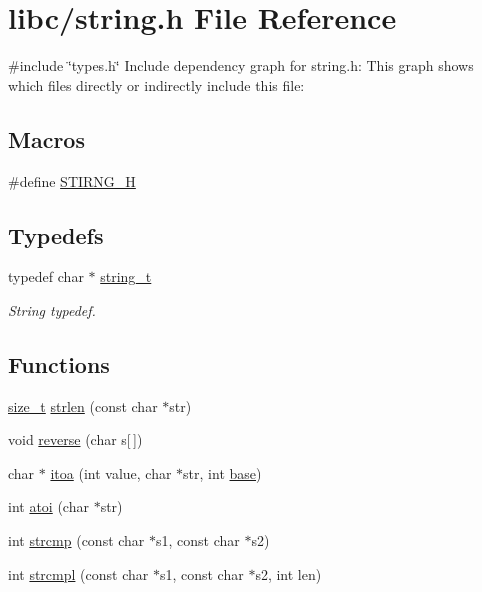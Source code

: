 \hypertarget{a00128}{}\section{libc/string.h File Reference}
\label{a00128}
{\ttfamily \#include \char`\"{}types.\+h\char`\"{}}\newline
Include dependency graph for string.\+h\+:
This graph shows which files directly or indirectly include this file\+:
\subsection*{Macros}
\begin{DoxyCompactItemize}
\item 
\#define \hyperlink{a00128_a5338bd16a174527274acc5062483b702_a5338bd16a174527274acc5062483b702}{S\+T\+I\+R\+N\+G\+\_\+H}
\end{DoxyCompactItemize}
\subsection*{Typedefs}
\begin{DoxyCompactItemize}
\item 
typedef char $\ast$ \hyperlink{a00128_ab0dcbec9b4b3c60b939b1095f93cb1b9_ab0dcbec9b4b3c60b939b1095f93cb1b9}{string\+\_\+t}
\begin{DoxyCompactList}\small\item\em String typedef. \end{DoxyCompactList}\end{DoxyCompactItemize}
\subsection*{Functions}
\begin{DoxyCompactItemize}
\item 
\hyperlink{a00140_a29d85914ddff32967d85ada69854206d_a29d85914ddff32967d85ada69854206d}{size\+\_\+t} \hyperlink{a00128_a008e171a518fe0e0352f31b245e03875_a008e171a518fe0e0352f31b245e03875}{strlen} (const char $\ast$str)
\item 
void \hyperlink{a00128_aa8a9a8836962d890b4939c112fd29190_aa8a9a8836962d890b4939c112fd29190}{reverse} (char s\mbox{[}$\,$\mbox{]})
\item 
char $\ast$ \hyperlink{a00128_ab42640268f26e065efd044cfe80591bd_ab42640268f26e065efd044cfe80591bd}{itoa} (int value, char $\ast$str, int \hyperlink{a00110_a0523cedff47e2441fc198b7770ec5d3f_a0523cedff47e2441fc198b7770ec5d3f}{base})
\item 
int \hyperlink{a00128_a8456d79947fb428e0927d19e7a1e9423_a8456d79947fb428e0927d19e7a1e9423}{atoi} (char $\ast$str)
\item 
int \hyperlink{a00128_a11bd144d7d44914099a3aeddf1c8567d_a11bd144d7d44914099a3aeddf1c8567d}{strcmp} (const char $\ast$s1, const char $\ast$s2)
\item 
int \hyperlink{a00128_a3c8c44ba2ae232bc5ae8449de1448164_a3c8c44ba2ae232bc5ae8449de1448164}{strcmpl} (const char $\ast$s1, const char $\ast$s2, int len)
\end{DoxyCompactItemize}


